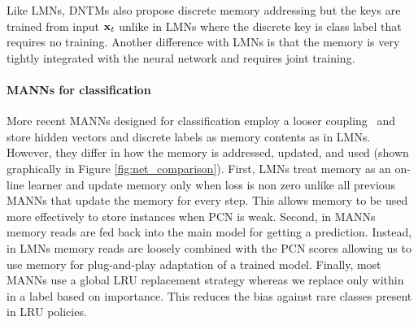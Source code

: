 \documentclass[letterpaper]{article} %
\newcommand{\vek}[1]{{\bf {#1}}}
\newcommand{\vx}{{\vek{x}}}
\def\sunita#1{\todo [color=purple]{Sunita: #1}}
\begin{document}
Like LMNs, DNTMs also propose discrete memory addressing but the keys are trained from input $\vx_t$ unlike in LMNs where the discrete key is class label that requires no training.
Another difference with LMNs is that the memory is very tightly integrated with the neural network and requires joint training.



\paragraph{MANNs for classification}
More recent MANNs designed for classification employ a looser coupling~\cite{kaiser2017,SantoroBBWL16} and store hidden vectors and discrete labels as memory contents as in LMNs.
%
However, they differ in how the memory is addressed, updated, and used (shown graphically in Figure \ref{fig:net_comparison}).
First, LMNs treat memory as an on-line learner and update memory only when loss is non zero unlike all previous MANNs that update the memory for every step.  This allows memory to be used more effectively to store instances when PCN is weak.
Second, in MANNs memory reads are fed back into the main model for getting a prediction.  Instead, in LMNs memory reads are loosely combined with the PCN scores allowing us to use memory for plug-and-play adaptation of a trained model.  Finally, most MANNs use a global LRU replacement strategy whereas we replace only within in a label based on importance. This reduces the bias against rare classes present in LRU policies.


\end{document}
